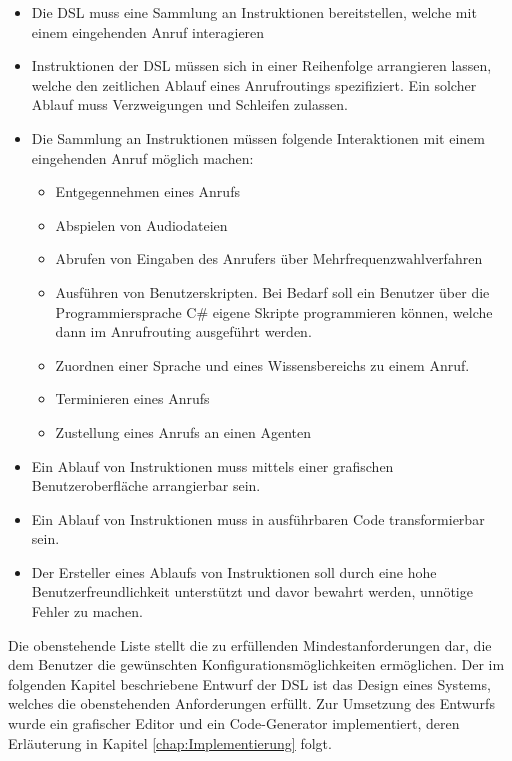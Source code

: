 \begin{itemize}
\item Die DSL muss eine Sammlung an Instruktionen bereitstellen, welche mit einem eingehenden Anruf interagieren
\item Instruktionen der DSL müssen sich in einer Reihenfolge arrangieren lassen, welche den zeitlichen Ablauf eines Anrufroutings spezifiziert. Ein solcher Ablauf muss Verzweigungen und Schleifen zulassen.
\item Die Sammlung an Instruktionen müssen folgende Interaktionen mit einem eingehenden Anruf möglich machen:
	\begin{itemize}
	\item Entgegennehmen eines Anrufs
	\item Abspielen von Audiodateien 
	\item Abrufen von Eingaben des Anrufers über Mehrfrequenzwahlverfahren
	\item Ausführen von Benutzerskripten. Bei Bedarf soll ein Benutzer über die Programmiersprache C\# eigene Skripte programmieren können, welche dann im Anrufrouting ausgeführt werden.
	\item Zuordnen einer Sprache und eines Wissensbereichs zu einem Anruf.
	\item Terminieren eines Anrufs
	\item Zustellung eines Anrufs an einen Agenten
	\end{itemize}
\item Ein Ablauf von Instruktionen muss mittels einer grafischen Benutzeroberfläche arrangierbar sein.
\item Ein Ablauf von Instruktionen muss in ausführbaren Code transformierbar sein.
\item Der Ersteller eines Ablaufs von Instruktionen soll durch eine hohe Benutzerfreundlichkeit unterstützt und davor bewahrt werden, unnötige Fehler zu machen.  
\end{itemize}
Die obenstehende Liste stellt die zu erfüllenden Mindestanforderungen dar, die dem Benutzer die gewünschten Konfigurationsmöglichkeiten ermöglichen. Der im folgenden Kapitel beschriebene Entwurf der DSL ist das Design eines Systems, welches die obenstehenden Anforderungen erfüllt. Zur Umsetzung des Entwurfs wurde ein grafischer Editor und ein Code-Generator implementiert, deren Erläuterung in Kapitel \ref{chap:Implementierung} folgt.


